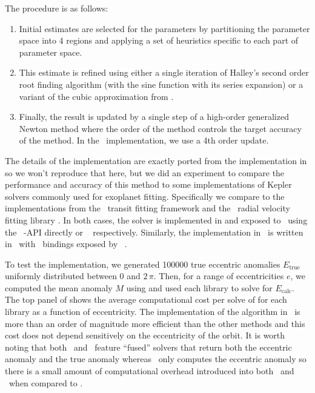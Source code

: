 \documentclass[modern]{aastex62}
\begin{document}
The procedure is as follows:
\begin{enumerate}

\item Initial estimates are selected for the parameters by partitioning the
parameter space into 4 regions and applying a set of heuristics specific to
each part of parameter space.

\item This estimate is refined using either a single iteration of Halley's
second order root finding algorithm (with the sine function with its series
expansion) or a variant of the cubic approximation from \citet{Mikkola:1987}.

\item Finally, the result is updated by a single step of a high-order
generalized Newton method where the order of the method controls the target
accuracy of the method. In the \exoplanet\ implementation, we use a 4th order
update.

\end{enumerate}

The details of the implementation are exactly ported from the implementation
in \citet{Nijenhuis:1991} so we won't reproduce that here, but we did an
experiment to compare the performance and accuracy of this method to some
implementations of Kepler solvers commonly used for exoplanet fitting.
Specifically we compare to the implementations from the \batman\ transit
fitting framework \citep{Kreidberg:2015} and the \radvel\ radial velocity
fitting library \citep{Fulton:2018, Fulton:2020}.
In both cases, the solver is implemented in  and exposed to
\python\ using the \python\ -API directly or \cython\
\citep{Behnel:2011} respectively.
Similarly, the implementation in \exoplanet\ is written in \cpp\ with \python\
bindings exposed by \theano\ \citep{Theano-Development-Team:2016}.

To test the implementation, we generated 100000 true eccentric anomalies
$E_\mathrm{true}$ uniformly distributed between $0$ and $2\,\pi$.
Then, for a range of eccentricities $e$, we computed the mean anomaly $M$ using
 and used each library to solve \eq{kepler-equation} for
$E_\mathrm{calc}$.
The top panel of \Figure{kepler_solver} shows the average computational cost per
solve of  for each library as a function of eccentricity.
The implementation of the \citet{Nijenhuis:1991} algorithm in \exoplanet\ is
more than an order of magnitude more efficient than the other methods and this
cost does not depend sensitively on the eccentricity of the orbit.
It is worth noting that both \batman\ and \exoplanet\ feature ``fused''
solvers that return both the eccentric anomaly and the true anomaly whereas
\radvel\ only computes the eccentric anomaly so there is a small amount of
computational overhead introduced into both \exoplanet\ and \batman\ when
compared to \radvel.
\end{document}
